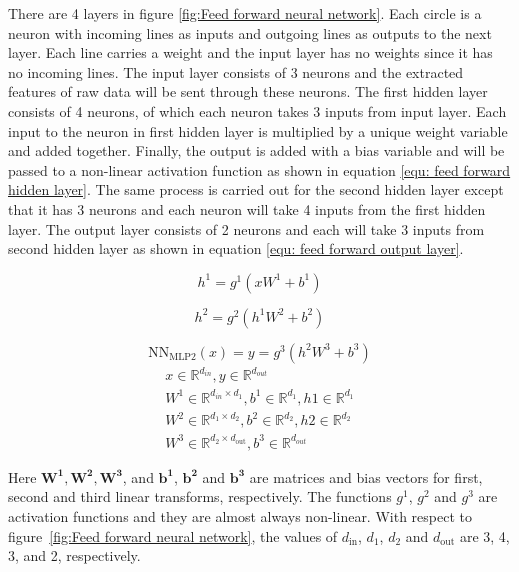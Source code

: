 \documentclass[a4paper, 11pt]{article}
\begin{document}
There are 4 layers in figure \ref{fig:Feed forward neural network}. Each circle is a neuron with incoming lines as inputs and outgoing lines as outputs to the next layer. Each line carries a weight and the input layer has no weights since it has no incoming lines. The input layer consists of 3 neurons and the extracted features of raw data will be sent through these neurons. The first hidden layer consists of 4 neurons, of which each neuron takes 3 inputs from input layer. Each input to the neuron in first hidden layer is multiplied by a unique weight variable and added together.  Finally, the output is added with a bias variable and will be passed to a non-linear activation function as shown in equation \ref{equ: feed forward hidden layer}. The same process is carried out for the second hidden layer except that it has 3 neurons and each neuron will take 4 inputs from the first hidden layer. The output layer consists of 2 neurons and each will take 3 inputs from second hidden layer as shown in equation \ref{equ: feed forward output layer}.

\begin{equation} \label{equ: feed forward hidden layer}
h^1 = g^1(xW^1 + b^1)
\end{equation}

\begin{equation}
h^2 = g^2(h^1W^2 + b^2)
\end{equation}

\begin{equation} \label{equ: feed forward output layer}
\mathrm{NN_{MLP2}}(x) = y = g^3(h^2W^3 + b^3)
\end{equation}
\begin{align*}
x \in \mathbb{R}^{d_{in}}, y \in \mathbb{R}^{d_{out}} \\
W^1 \in \mathbb{R}^{d_{in} \times d_1}, b^1 \in \mathbb{R}^{d_1}, h1 \in \mathbb{R}^{d_{1}} \\
W^2 \in \mathbb{R}^{d_1 \times d_2}, b^2 \in \mathbb{R}^{d_2}, h2 \in \mathbb{R}^{d_{2}}\\
W^3 \in \mathbb{R}^{d_2 \times d_\mathrm{out}}, b^3 \in \mathbb{R}^{d_{out}}
\end{align*}

Here $\mathbf{W^1, W^2, W^3}$,  and $\mathbf{b^1}$, $\mathbf{b^2}$ and $\mathbf{b^3}$ are matrices and bias vectors for first, second and third linear transforms, respectively. The functions $g^1$, $g^2$ and $g^3$ are activation functions and they are almost always non-linear. With respect to figure~\ref{fig:Feed forward neural network}, the values of $d_\mathrm{in}$, $d_{1}$, $d_{2}$ and $d_\mathrm{out}$ are 3, 4, 3, and 2, respectively. 
\end{document}
